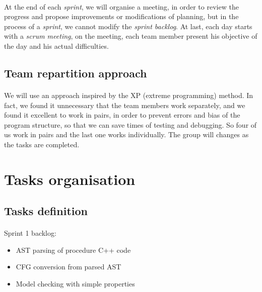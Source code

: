 \documentclass{report}
\begin{document}
\paragraph{}
\hspace{4mm}\textnormal{At the end of each \textit{sprint}, we will organise a meeting, in order to 
review the progress and propose improvements or modifications of planning,
 but in the process of a \textit{sprint}, we cannot modify the \textit{sprint backlog}. 
At last, each day starts with a \textit{scrum meeting}, on the meeting, each 
team member present his objective of the day and his actual difficulties.}

\subsection{Team repartition approach}

\paragraph{}
\hspace{4mm}\textnormal{We will use an approach inspired by the XP (extreme programming) method. 
In fact, we found it unnecessary that the team members work separately, 
and we found it excellent to work in pairs, in order to prevent errors and bias 
of the program structure, so that we can save times of testing and debugging. 
So four of us work in pairs and the last one works individually. The group 
will changes as the tasks are completed.}

\section{Tasks organisation}

\subsection{Tasks definition}

\paragraph{}
\hspace{4mm}\textnormal{Sprint 1 backlog:}

\vspace{4mm}
\begin{itemize}
\item AST parsing of procedure C++ code\vspace{1mm}
\item CFG conversion from parsed AST\vspace{1mm}
\item Model checking with simple properties\vspace{1mm}
\end{itemize}
\end{document}
